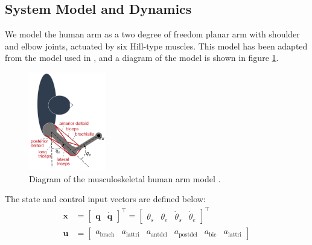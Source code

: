 \documentclass[letterpaper, 10pt, conference]{ieeeconf}
\begin{document}
\subsection{System Model and Dynamics}
We model the human arm as a two degree of freedom planar arm with shoulder and elbow joints, actuated by six Hill-type muscles. This model has been adapted from the model used in \cite{stochastic_model}, and a diagram of the model is shown in figure \ref{fig:arm_model}. 

\begin{figure}[h]
    \centering
    \includegraphics[width=0.3\textwidth]{images/arm_model_diagram.png}
    \caption{Diagram of the musculoskeletal human arm model \cite{stochastic_model}.}
    \label{fig:arm_model}
\end{figure}

The state and control input vectors are defined below:
\begin{align}
    \mathbf{x} &= \begin{bmatrix}
        \mathbf{q} &
        \dot{\mathbf{q}}
    \end{bmatrix}^\top = \begin{bmatrix}
        \theta_s &
        \theta_e &
        \dot{\theta}_s &
        \dot{\theta}_e
    \end{bmatrix}^\top \\
    \mathbf{u} &= \begin{bmatrix}
        a_{\text{brach}} & a_{\text{lattri}} & a_{\text{antdel}} & a_{\text{postdel}} & a_{\text{bic}} & a_{\text{lattri}}
    \end{bmatrix}
\end{align}
\end{document}
